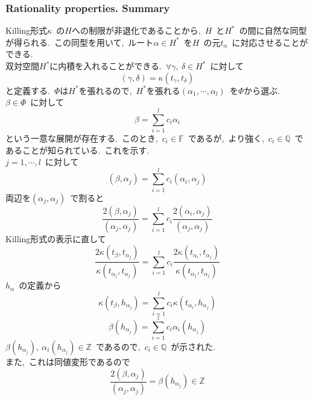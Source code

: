 \documentclass[uplatex,dvipdfmx]{jsarticle}
\begin{document}
\subsubsection{Rationality properties. Summary}
Killing形式$\kappa$~の$H$への制限が非退化であることから,~$H$~と$H^*$~の間に自然な同型が得られる.~この同型を用いて,~ルート$\alpha \in H^*$~を$H$~の元$t_\alpha$~に対応させることができる.\\
双対空間$H^*$に内積を入れることができる.~$\forall \gamma,~\delta \in H^*$~に対して
\begin{equation*}
    (\gamma, \delta) = \kappa(t_\gamma, t_\delta)
\end{equation*}
と定義する.~$\Phi$は$H^*$を張れるので,~$H^*$を張れる$(\alpha_1, \cdots, \alpha_l)$~を$\Phi$から選ぶ.\\
$\beta \in \Phi$~に対して
\begin{equation}
    \beta = \sum_{i=1}^l c_i \alpha_i
\end{equation}
という一意な展開が存在する.~このとき,~$c_i \in \mathbb{F}$~であるが,~より強く,~$c_i \in \mathbb{Q}$~であることが知られている.~これを示す.\\
$j = 1, \cdots, l$~に対して
\begin{equation*}
    (\beta, \alpha_j) = \sum_{i=1}^l c_i (\alpha_i, \alpha_j)
\end{equation*}
両辺を$(\alpha_j, \alpha_j)$~で割ると
\begin{equation*}
    \frac{2(\beta, \alpha_j)}{(\alpha_j, \alpha_j)} = \sum_{i=1}^l c_i \frac{2(\alpha_i, \alpha_j)}{(\alpha_j, \alpha_j)}
\end{equation*}
Killing形式の表示に直して
\begin{equation}
    \frac{2 \kappa(t_\beta,t_{\alpha_j} )}{\kappa(t_{\alpha_j}, t_{\alpha_j})} = \sum_{i=1}^l c_i \frac{2\kappa(t_{\alpha_i}, t_{\alpha_j})}{\kappa(t_{\alpha_j}, t_{\alpha_j})}
\end{equation}
$h_\alpha$~の定義から
\begin{equation*}
    \kappa(t_\beta, h_{\alpha_j}) = \sum_{i=1}^l c_i \kappa(t_{\alpha_i}, h_{\alpha_j})
\end{equation*}
\begin{equation}
    \beta(h_{\alpha_j}) = \sum_{i=1}^l c_i \alpha_i(h_{\alpha_j})
\end{equation}
$\beta(h_{\alpha_j}),~\alpha_i(h_{\alpha_j}) \in \mathbb{Z}$~であるので,~$c_i \in \mathbb{Q}$~が示された.\\
また,~これは同値変形であるので
\begin{equation}
    \frac{2(\beta, \alpha_j)}{(\alpha_j, \alpha_j)} = \beta(h_{\alpha_j}) \in \mathbb{Z}
\end{equation}
\end{document}
